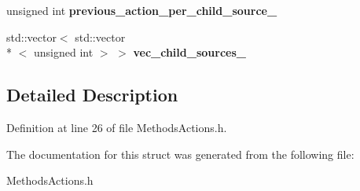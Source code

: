 \begin{DoxyCompactItemize}
\item 
\hypertarget{structStruct__Actions_abf351c2b735511e15a54c3821002b9da}{unsigned int {\bfseries previous\-\_\-action\-\_\-per\-\_\-child\-\_\-source\-\_\-}}\label{structStruct__Actions_abf351c2b735511e15a54c3821002b9da}

\item 
\hypertarget{structStruct__Actions_aae321f0f30f1249a87113e4dd9644630}{std\-::vector$<$ std\-::vector\\*
$<$ unsigned int $>$ $>$ {\bfseries vec\-\_\-child\-\_\-sources\-\_\-}}\label{structStruct__Actions_aae321f0f30f1249a87113e4dd9644630}

\end{DoxyCompactItemize}


\subsection{Detailed Description}


Definition at line 26 of file Methods\-Actions.\-h.



The documentation for this struct was generated from the following file\-:\begin{DoxyCompactItemize}
\item 
Methods\-Actions.\-h\end{DoxyCompactItemize}
